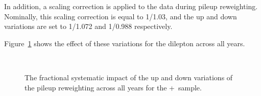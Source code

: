 {In addition, a scaling correction is applied to the data during pileup reweighting. Nominally, this scaling correction is equal to 1/1.03, and the up and down variations are set to 1/1.072 and 1/0.988 respectively.

Figure~\ref{fig:PRWpTll} shows the effect of these variations for the dilepton \pt across all years.

\begin{figure}[h!]
  \centering
   \\
  \caption{The fractional systematic impact of the up and down variations of the pileup reweighting across all years for the \powheg+\pythia~sample.}
  \label{fig:PRWpTll}
\end{figure}

}
